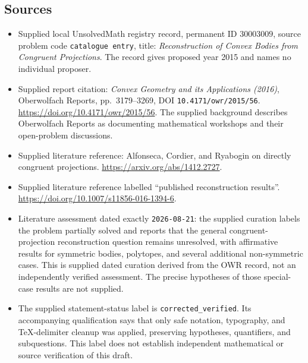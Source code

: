 \documentclass[11pt]{article}
\begin{document}
\subsection{Sources}
\begin{itemize}
\item Supplied local UnsolvedMath registry record, permanent ID \(30003009\), source problem code \texttt{catalogue entry}, title: \emph{Reconstruction of Convex Bodies from Congruent Projections}. The record gives proposed year 2015 and names no individual proposer.
\item Supplied report citation: \emph{Convex Geometry and its Applications (2016)}, Oberwolfach Reports, pp.~3179--3269, DOI \texttt{10.4171/owr/2015/56}. \url{https://doi.org/10.4171/owr/2015/56}. The supplied background describes Oberwolfach Reports as documenting mathematical workshops and their open-problem discussions.
\item Supplied literature reference: Alfonseca, Cordier, and Ryabogin on directly congruent projections. \url{https://arxiv.org/abs/1412.2727}.
\item Supplied literature reference labelled ``published reconstruction results''. \url{https://doi.org/10.1007/s11856-016-1394-6}.
\item Literature assessment dated exactly \texttt{2026-08-21}: the supplied curation labels the problem partially solved and reports that the general congruent-projection reconstruction question remains unresolved, with affirmative results for symmetric bodies, polytopes, and several additional non-symmetric cases. This is supplied dated curation derived from the OWR record, not an independently verified assessment. The precise hypotheses of those special-case results are not supplied.
\item The supplied statement-status label is \texttt{corrected\_verified}. Its accompanying qualification says that only safe notation, typography, and TeX-delimiter cleanup was applied, preserving hypotheses, quantifiers, and subquestions. This label does not establish independent mathematical or source verification of this draft.
\end{itemize}
\end{document}

